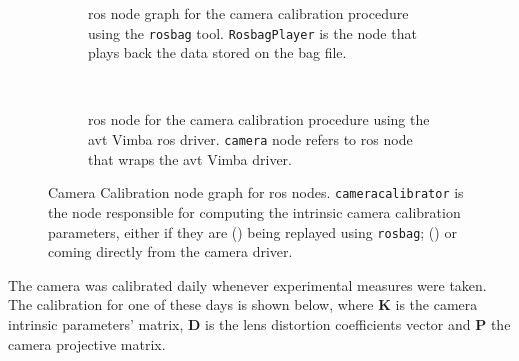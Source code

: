 \begin{figure}[H]
	\vspace{5mm}
	\centering
	\begin{subfigure}[c]{0.8\textwidth}
		\centering
		\def\svgwidth{\columnwidth}
		\graphicspath{{img/camera-calibration/}}
		
		\caption{\ac{ros} node graph for the camera calibration procedure using the \texttt{rosbag} tool. \texttt{RosbagPlayer} is the node that plays back the data stored on the bag file.}
		\label{fig:camera-calibration-bag-rosgraph}
	\end{subfigure}
	\vspace{5mm} \\ 
	\begin{subfigure}[c]{0.8\textwidth}
		\centering
		\def\svgwidth{\columnwidth}
		\graphicspath{{img/camera-calibration/}}
		
		\caption{\ac{ros} node for the camera calibration procedure using the \ac{avt} Vimba \ac{ros} driver. \texttt{camera} node refers to \ac{ros} node that wraps the \ac{avt} Vimba driver.}
		\label{fig:camera-calibration-avt-rosgraph}
	\end{subfigure}
	\caption{Camera Calibration node graph for \ac{ros} nodes. \texttt{cameracalibrator} is the node responsible for computing the intrinsic camera calibration parameters, either if they are () being replayed using \texttt{rosbag}; () or coming directly from the camera driver.}
	\label{fig:camera-calibration-rosgraph}
\end{figure}

The camera was calibrated daily whenever experimental measures were taken. The calibration for one of these days is shown below, where $\mathbf{K}$ is the camera intrinsic parameters' matrix, $\mathbf{D}$ is the lens distortion coefficients vector and $\mathbf{P}$ the camera projective matrix. %

